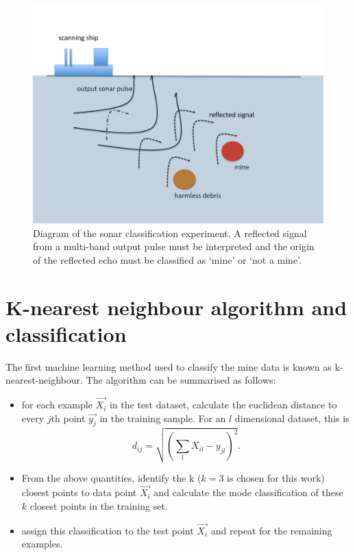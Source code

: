 \documentclass[10pt]{article}
\begin{document}
\begin{figure}
\begin{center}
\includegraphics[scale=0.6,angle=0,trim=2cm 0cm 0cm 2cm]{sonar_diagram.pdf}
\caption{Diagram of the sonar classification experiment. A reflected signal from a multi-band output pulse must be interpreted and the origin of the reflected echo must be classified as `mine' or `not a mine'. }
\label{fig_diag}
\end{center}
\end{figure} 




\section{K-nearest neighbour algorithm and classification}
The first machine learning method used to classify the mine data is known as k-nearest-neighbour. The algorithm can be summarised as follows:

\begin{itemize}
\item for each example $\vec{X_i}$ in the test dataset, calculate the euclidean distance to every $j$th point $\vec{y_j}$ in the training sample. For an $l$ dimensional dataset, this is 
\begin{equation}
d_{ij} = \sqrt{\left( \sum_l X_{il} - y_{jl} \right)^2}.
\label{eq_euclid}
\end{equation}

\item From the above quantities, identify the k ($k = 3$ is chosen for this work) closest points to data point $\vec{X_i}$ and calculate the mode classification of these $k$ closest points in the training set.

\item assign this classification to the test point $\vec{X_i}$ and repeat for the remaining examples.


\end{itemize}
\end{document}
